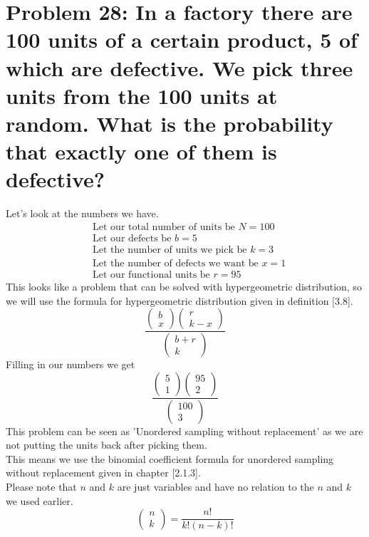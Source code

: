 \documentclass[12pt]{article}
\begin{document}
\section*{Problem 28: In a factory there are 100 units of a certain product, 5 of which are defective. We pick
three units from the 100 units at random. What is the probability that exactly one of
them is defective?}
Let's look at the numbers we have.
\begin{align*}
& \text{Let our total number of units be } N = 100 \\
& \text{Let our defects be } b = 5 \\
& \text{Let the number of units we pick be } k = 3 \\
& \text{Let the number of defects we want be } x = 1 \\
& \text{Let our functional units be } r = 95
\end{align*}
This looks like a problem that can be solved with hypergeometric 
distribution, so
we will use the formula for hypergeometric distribution
given in definition [3.8]\cite{STAT}.\\
\[
\frac{\begin{pmatrix} b\\x\end{pmatrix}\begin{pmatrix} r\\k-x\end{pmatrix}
}{\begin{pmatrix} b+r\\k\end{pmatrix}}
\]
Filling in our numbers we get
\[
\frac{\begin{pmatrix} 5\\1\end{pmatrix}\begin{pmatrix} 95\\2\end{pmatrix}
}{\begin{pmatrix} 100\\3\end{pmatrix}}
\]
This problem can be seen as 'Unordered sampling without replacement' as
we are not putting the units back after picking them.\\
This means we use the binomial coefficient formula for unordered sampling without replacement
given in chapter [2.1.3]\cite{STAT}.\\
Please note that $n$ and $k$ are just variables and have no relation to the $n$ and $k$ we used earlier.
\[
\begin{pmatrix} n\\k\end{pmatrix} = \frac{n!}{k!(n-k)!}
\]
\end{document}
